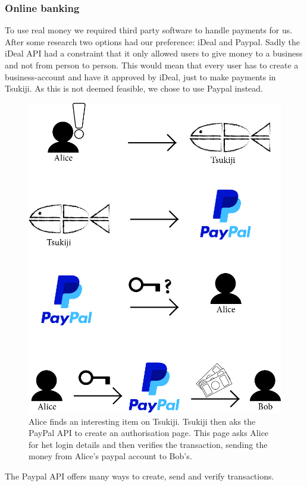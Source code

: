 \subsubsection{Online banking}
To use real money we required third party software to handle payments for us. 
After some research two options had our preference: iDeal and Paypal.
Sadly the iDeal API had a constraint that it only allowed users to give money to a business and not from person to person.
This would mean that every user has to create a business-account and have it approved by iDeal, just to make payments in Tsukiji.
As this is not deemed feasible, we chose to use Paypal instead.
\begin{figure}[H]
  \centering
  \includegraphics[width=\linewidth]{paypal-payment}
  \caption{Alice finds an interesting item on Tsukiji. Tsukiji then aks the PayPal API to create an authorisation page. This page asks Alice for het login details and then verifies the transaction, sending the money from Alice's paypal account to Bob's.}
  \label{paypal_pay}
\end{figure}
\newpage
The Paypal API\cite{paypal} offers many ways to create, send and verify transactions.
